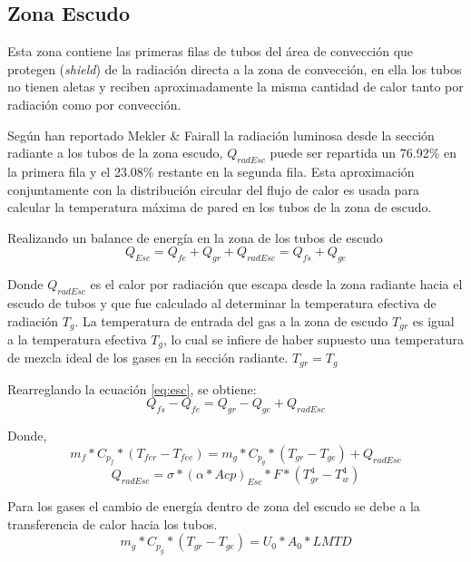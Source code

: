 \subsection{Zona Escudo}
\par Esta zona contiene las primeras filas de tubos del área de convección que protegen (\textit{shield}) de la radiación directa a la zona de convección, en ella los tubos no tienen aletas y reciben aproximadamente la misma cantidad de calor tanto por radiación como por convección.
\par Según han reportado Mekler \& Fairall \cite{bib:mekler} la radiación luminosa desde la sección radiante a los tubos de la zona escudo, $Q_{radEsc}$ puede ser repartida un 76.92\% en la primera fila y el 23.08\% restante en la segunda fila. Esta aproximación conjuntamente con la distribución circular del flujo de calor es usada para calcular la temperatura máxima de pared en los tubos de la zona de escudo.
\par Realizando un balance de energía en la zona de los tubos de escudo
\begin{equation}
\label{eq:esc}
Q_{Esc} = Q_{fe} + Q_{gr} + Q_{radEsc} = Q_{fs} + Q_{ge}
\end{equation}
\par Donde $Q_{radEsc}$ es el calor por radiación que escapa desde la zona radiante hacia el escudo de tubos y que fue calculado al determinar la temperatura efectiva de radiación $T_g$. La temperatura de entrada del gas a la zona de escudo $T_{gr}$ es igual a la temperatura efectiva $T_g$, lo cual se infiere de haber supuesto una temperatura de mezcla ideal de los gases en la sección radiante. $T_{gr} = T_g$
\par Rearreglando la ecuación \ref{eq:esc}, se obtiene:
\begin{equation}
Q_{fs} - Q_{fe} = Q_{gr} - Q_{ge} + Q_{radEsc}
\end{equation}
\par Donde,
\begin{equation}
\label{eq:qesc}
m_{f} *C_{p_f} *(T_{fer} - T_{fee}) = 
m_{g} *C_{p_g} *(T_{gr}  - T_{ge}) + Q_{radEsc}
\end{equation}
\begin{equation} \label{eq:esc-radi}
Q_{radEsc} = \sigma *(\alpha *Acp )_{Esc} *F *(T_{gr}^4 -T_w^4)
\end{equation}
\par Para los gases el cambio de energía dentro de zona del escudo se debe a la transferencia de calor hacia los tubos.
\begin{equation}
\label{eq:qesc-lmtd}
m_{g} *C_{p_g} *(T_{gr} -T_{ge}) = U_0 *A_0 *LMTD
\end{equation}

